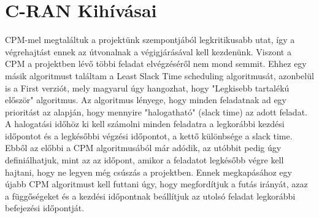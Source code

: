 \section{C-RAN Kihívásai}
\hspace{2mm}  \indent CPM-mel megtaláltuk a projektünk szempontjából legkritikusabb utat, így a végrehajtást ennek az útvonalnak a végigjárásával kell kezdenünk. Viszont a CPM  a projektben lévő többi feladat elvégzéséről nem mond semmit. Ehhez egy másik algoritmust találtam a Least Slack Time scheduling algoritmusát, azonbelül is a First verziót, mely magyarul úgy hangozhat, hogy "Legkisebb tartalékú először" algoritmus.\cite{LST} Az algoritmus lényege, hogy minden feladatnak ad egy prioritást az alapján, hogy mennyire "halogatható" (slack time) az adott feladat. A halogatási időhöz ki kell számolni minden feladatra a legkorábbi kezdési időpontot és a legkésőbbi végzési időpontot, a kettő különbsége a slack time. Ebből az előbbi a CPM algoritmusából már adódik, az utóbbit pedig úgy definiálhatjuk, mint az az időpont, amikor a feladatot legkésőbb végre kell hajtani, hogy ne legyen még csúszás a projektben. Ennek megkapásához egy újabb CPM algoritmust kell futtani úgy, hogy megfordítjuk a futás irányát, azaz a függőségeket és a kezdési időpontnak beállítjuk az utolsó feladat legkorábbi befejezési időpontját. 